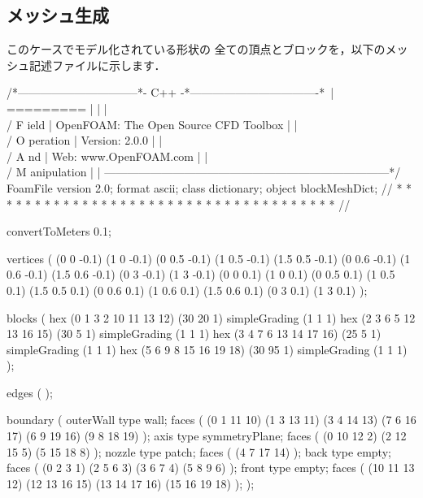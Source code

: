 \subsection{メッシュ生成}
\label{ssec:3.4.2}
このケースでモデル化されている形状の
全ての頂点とブロックを，以下のメッシュ記述ファイルに示します．
\begin{OFverbatim}
/*--------------------------------*- C++ -*----------------------------------*\
| =========                 |                                                 |
| \\      /  F ield         | OpenFOAM: The Open Source CFD Toolbox           |
|  \\    /   O peration     | Version:  2.0.0                                 |
|   \\  /    A nd           | Web:      www.OpenFOAM.com                      |
|    \\/     M anipulation  |                                                 |
\*---------------------------------------------------------------------------*/
FoamFile
{
    version     2.0;
    format      ascii;
    class       dictionary;
    object      blockMeshDict;
}
// * * * * * * * * * * * * * * * * * * * * * * * * * * * * * * * * * * * * * //

convertToMeters 0.1;

vertices        
(
    (0 0 -0.1)
    (1 0 -0.1)
    (0 0.5 -0.1)
    (1 0.5 -0.1)
    (1.5 0.5 -0.1)
    (0 0.6 -0.1)
    (1 0.6 -0.1)
    (1.5 0.6 -0.1)
    (0 3 -0.1)
    (1 3 -0.1)
    (0 0 0.1)
    (1 0 0.1)
    (0 0.5 0.1)
    (1 0.5 0.1)
    (1.5 0.5 0.1)
    (0 0.6 0.1)
    (1 0.6 0.1)
    (1.5 0.6 0.1)
    (0 3 0.1)
    (1 3 0.1)
);

blocks          
(
    hex (0 1 3 2 10 11 13 12) (30 20 1) simpleGrading (1 1 1)
    hex (2 3 6 5 12 13 16 15) (30 5 1) simpleGrading (1 1 1)
    hex (3 4 7 6 13 14 17 16) (25 5 1) simpleGrading (1 1 1)
    hex (5 6 9 8 15 16 19 18) (30 95 1) simpleGrading (1 1 1)
);

edges           
(
);

boundary
(
    outerWall
    {
        type wall;
        faces
        (
            (0 1 11 10)
            (1 3 13 11)
            (3 4 14 13)
            (7 6 16 17)
            (6 9 19 16)
            (9 8 18 19)
        );
    }
    axis
    {
        type symmetryPlane;
        faces
        (
            (0 10 12 2)
            (2 12 15 5)
            (5 15 18 8)
        );
    }
    nozzle
    {
        type patch;
        faces
        (
            (4 7 17 14)
        );
    }
    back
    {
        type empty;
        faces
        (
            (0 2 3 1)
            (2 5 6 3)
            (3 6 7 4)
            (5 8 9 6)
        );
    }
    front
    {
        type empty;
        faces
        (
            (10 11 13 12)
            (12 13 16 15)
            (13 14 17 16)
            (15 16 19 18)
        );
    }
);


\end{OFverbatim}
